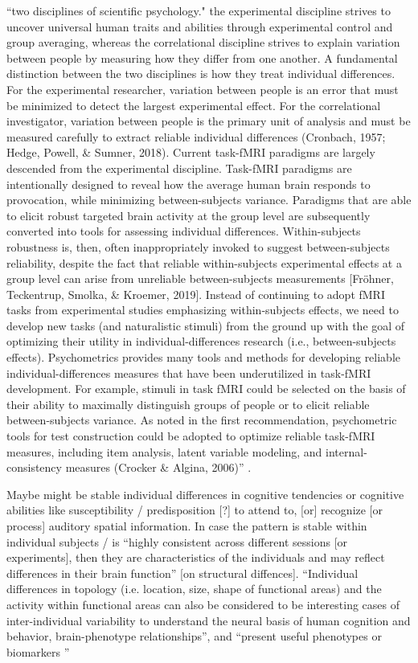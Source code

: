 ``two disciplines of scientific psychology."
the experimental discipline strives to uncover universal human traits and
abilities through experimental control and group averaging, whereas the
correlational discipline strives to explain variation between people by
measuring how they differ from one another.
%
A fundamental distinction between the two disciplines is how they treat
individual differences.
%
For the experimental researcher, variation between people is an error that must
be minimized to detect the largest experimental effect.
%
For the correlational investigator, variation between people is the primary unit
of analysis and must be measured carefully to extract reliable individual
differences (Cronbach, 1957; Hedge, Powell, \& Sumner, 2018).
%
Current task-fMRI paradigms are largely descended from the experimental
discipline.
%
Task-fMRI paradigms are intentionally designed to reveal how the average human
brain responds to provocation, while minimizing between-subjects variance.
%
Paradigms that are able to elicit robust targeted brain activity at the group
level are subsequently converted into tools for assessing individual
differences.
%
Within-subjects robustness is, then, often inappropriately invoked to suggest
between-subjects reliability, despite the fact that reliable within-subjects
experimental effects at a group level can arise from unreliable between-subjects
measurements [Fröhner, Teckentrup, Smolka, \& Kroemer, 2019].
%
Instead of continuing to adopt fMRI tasks from experimental studies emphasizing
within-subjects effects, we need to develop new tasks (and naturalistic stimuli)
from the ground up with the goal of optimizing their utility in
individual-differences research (i.e., between-subjects effects).
%
Psychometrics provides many tools and methods for developing reliable
individual-differences measures that have been underutilized in task-fMRI
development.
%
For example, stimuli in task fMRI could be selected on the basis of their
ability to maximally distinguish groups of people or to elicit reliable
between-subjects variance.
%
As noted in the first recommendation, psychometric tools for test construction
could be adopted to optimize reliable task-fMRI measures, including item
analysis, latent variable modeling, and internal-consistency measures (Crocker
\& Algina, 2006)'' \citep{elliott2020test}.

%
Maybe might be stable individual differences in cognitive tendencies or
cognitive abilities like susceptibility / predisposition [?] to attend to, [or]
recognize [or process] auditory spatial information.
In case the pattern is stable within individual subjects / is ``highly
consistent across different sessions [or experiments], then they are
characteristics of the individuals and may reflect differences in their brain
function'' \citep{kanai2011structural} [on structural diffences].
%
``Individual differences in topology (i.e. location, size, shape of functional
areas) and the activity within functional areas can also be considered to be
interesting cases of inter-individual variability to understand the neural basis
of human cognition and behavior, brain-phenotype relationships'', and ``present
useful phenotypes or biomarkers \citep{glasser2016multi,
vanhorn2008individual}''


